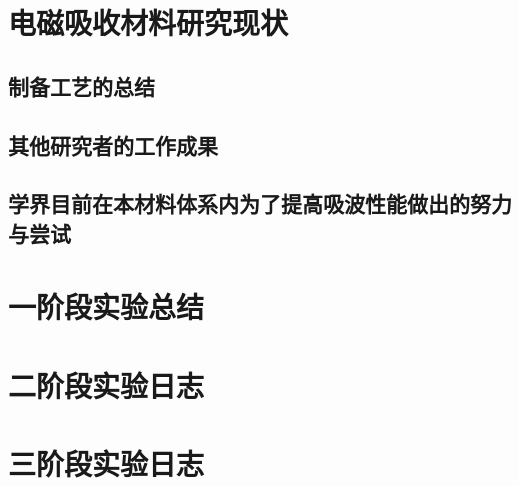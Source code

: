 \chapter{电磁吸收材料研究现状}
    \section{制备工艺的总结}
        
    \section{其他研究者的工作成果}
        
    \section{学界目前在本材料体系内为了提高吸波性能做出的努力与尝试}
        
\chapter{一阶段实验总结}

\chapter{二阶段实验日志}

















\chapter{三阶段实验日志}






